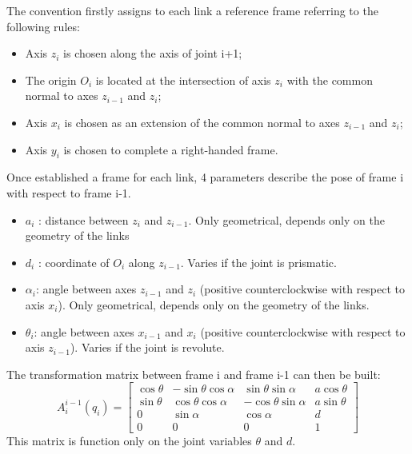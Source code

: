 The convention firstly assigns to each link a reference frame referring to the following rules: 
\begin{itemize}
	\item Axis $z_i$ is chosen along the axis of joint i+1;
	\item The origin $O_i$ is located at the intersection of axis $z_i$ with the common normal to axes $z_{i-1}$ and $z_i$;
	\item Axis $x_i$ is chosen as an extension of the common normal to axes $z_{i-1}$ and $z_i$;
	\item Axis $y_i$ is chosen to complete a right-handed frame.
\end{itemize}
Once established a frame for each link, 4 parameters describe the pose of frame i with respect to frame i-1.
\begin{itemize}
	\item $a_i$ : distance between $z_i$ and $z_{i-1}$. Only geometrical, depends only on the geometry of the links
	\item $d_i$ : coordinate of $O_i$ along $z_{i-1}$. Varies if the joint is prismatic.
	\item $\alpha_i$: angle between axes $z_{i-1}$ and $z_i$ (positive counterclockwise with respect to axis $x_i$). Only geometrical, depends only on the geometry of the links.
	\item $\theta_i$: angle between axes $x_{i-1}$ and $x_i$ (positive counterclockwise with respect to axis $z_{i-1}$). Varies if the joint is revolute.
\end{itemize}
The transformation matrix between frame i and frame i-1 can then be built:
\begin{equation}
	A_i^{i-1}(q_i)=\left[
	\begin{matrix}
		\cos\theta & -\sin\theta\cos\alpha & \sin\theta\sin\alpha & a\cos\theta \\
		\sin\theta & \cos\theta\cos\alpha & -\cos\theta\sin\alpha & a\sin\theta \\
		0 & \sin\alpha & \cos\alpha & d \\
		0 & 0 & 0 & 1
	\end{matrix}
	\right]
\end{equation}
This matrix is function only on the joint variables $\theta$ and $d$.

